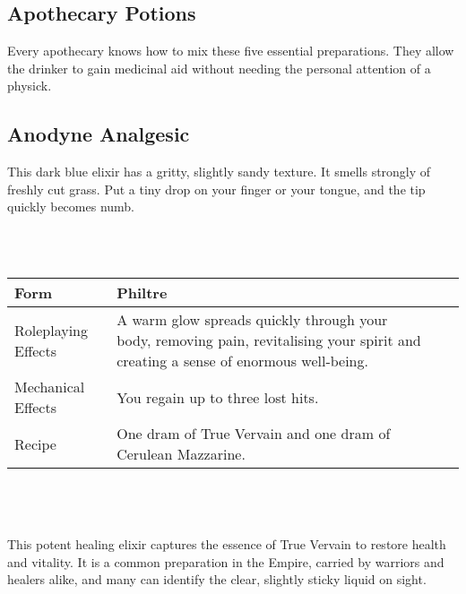 \documentclass[a5paper,pagesize,10pt,bibtotoc,pointlessnumbers,
normalheadings,DIV=9,twoside=false]{scrbook}
\newcommand\potion[7]{
    \section{#1}
    #2
    \\\\
    \begin{tabular}{| p{.18\linewidth} | p{.74\textwidth} |}
        \hline
        Form & #3 \\
        \hline
        Roleplaying Effects & #4 \\
        \hline
        Mechanical Effects & #5 \\
        \hline
        Recipe & #6 \\
        \hline
    \end{tabular}
    \\\\\\
    #7
    \newpage
}
\newcommand\mychapter[2]{
    \topskip0pt
    \vspace*{\fill}
    \begin{it}
    \chapter{#1}
        #2
    \end{it}
    \vspace*{\fill}
    \newpage
}
\begin{document}
\mychapter{Apothecary Potions}{
    Every apothecary knows how to mix these five essential preparations. They allow the drinker to gain medicinal aid without needing the personal attention of a physick.
}

\potion{Anodyne Analgesic}{
    This dark blue elixir has a gritty, slightly sandy texture. It smells strongly of freshly cut grass. Put a tiny drop on your finger or your tongue, and the tip quickly becomes numb.
}{Philtre}{
    The liquid numbs the pain of your injuries, and provides an invigoration that quickly clears your mind.
}{
    You can overcome the roleplaying effect of a single traumatic wound of your choice until the end of the current engagement. 
}{
    One dram of Marrowort and one dram of True Vervain.
}{
    Replacing the more cumbersome Anodyne Embrocation, this potent elixir numbs pain, and helps clear and focus the mind of the drinker. The philtre is not without its dangers; while it allows the imbiber to overcome many of the effects of a traumatic injury, it does nothing to actually treat the effects of such wounds. More than one soldier has dropped dead after using the potion to allow them to ignore a serious condition that required immediate medical attention. It can also be used to alleviate the symptoms of painful medical conditions such as inflamed joints, arthritis and rheumatism, but the cost of doing so with a potion tends to place this option outside the reach of all save the most wealthy.
}

\potion{Bloodharrow Philtre}{
    This translucent red liquid has tiny white particles suspended in it. It has a spicy scent, and a tiny amount on your tongue or your finger tingles unpleasantly for a moment.
}{Philtre}{
    Pain spreads rapidly through your body; you feel as if your blood is on fire. After a moment or two, the pain fades.
}{
    You lose the venom condition.
}{    
    One dram Imperial Roseweald and one dram of Marrowort.
}{
    A thin, slightly toxic elixir that harrows the blood of the one who drinks it. After a moment or two of agonising pain, the body is purged of venom, and of some minor poisons.
}

\potion{Elixir Vitae}{
    This translucent liquid is tinted a pale blue-green. It has a clean, fresh scent. A tiny drop of the sticky fluid on your tongue or your finger tingles pleasantly for a moment.
}{Philtre}{
    A warm glow spreads quickly through your body, removing pain, revitalising your spirit and creating a sense of enormous well-being.
}{
    You regain up to three lost hits.
}{
    One dram of True Vervain and one dram of Cerulean Mazzarine.
}{
    This potent healing elixir captures the essence of True Vervain to restore health and vitality. It is a common preparation in the Empire, carried by warriors and healers alike, and many can identify the clear, slightly sticky liquid on sight.
}
\end{document}
